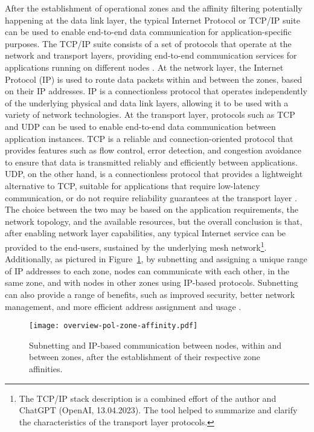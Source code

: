 After the establishment of operational zones and the affinity filtering potentially happening at the data link layer, the typical Internet Protocol or TCP/IP suite can be used to enable end-to-end data communication for application-specific purposes. The TCP/IP suite consists of a set of protocols that operate at the network and transport layers, providing end-to-end communication services for applications running on different nodes \cite{peterson2007computer}. At the network layer, the Internet Protocol (IP) is used to route data packets within and between the zones, based on their IP addresses. IP is a connectionless protocol that operates independently of the underlying physical and data link layers, allowing it to be used with a variety of network technologies. At the transport layer, protocols such as TCP and UDP can be used to enable end-to-end data communication between application instances. TCP is a reliable and connection-oriented protocol that provides features such as flow control, error detection, and congestion avoidance to ensure that data is transmitted reliably and efficiently between applications. UDP, on the other hand, is a connectionless protocol that provides a lightweight alternative to TCP, suitable for applications that require low-latency communication, or do not require reliability guarantees at the transport layer \cite{peterson2007computer}. The choice between the two may be based on the application requirements, the network topology, and the available resources, but the overall conclusion is that, after enabling network layer capabilities, any typical Internet service can be provided to the end-users, sustained by the underlying mesh network\footnote{The TCP/IP stack description is a combined effort of the author and ChatGPT (OpenAI, 13.04.2023). The tool helped to summarize and clarify the characteristics of the transport layer protocols.}. Additionally, as pictured in Figure~\ref{fig:proof-of-location-overview-pol-zone-affinity}, by subnetting and assigning a unique range of IP addresses to each zone, nodes can communicate with each other, in the same zone, and with nodes in other zones using IP-based protocols. Subnetting can also provide a range of benefits, such as improved security, better network management, and more efficient address assignment and usage \cite{peterson2007computer}.

\begin{figure}[h!]
    \begin{center}
    \texttt{[image: overview-pol-zone-affinity.pdf]}
    \caption{Subnetting and IP-based communication between nodes, within and between zones, after the establishment of their respective zone affinities.}
    \label{fig:proof-of-location-overview-pol-zone-affinity}
    \end{center}
\end{figure}


